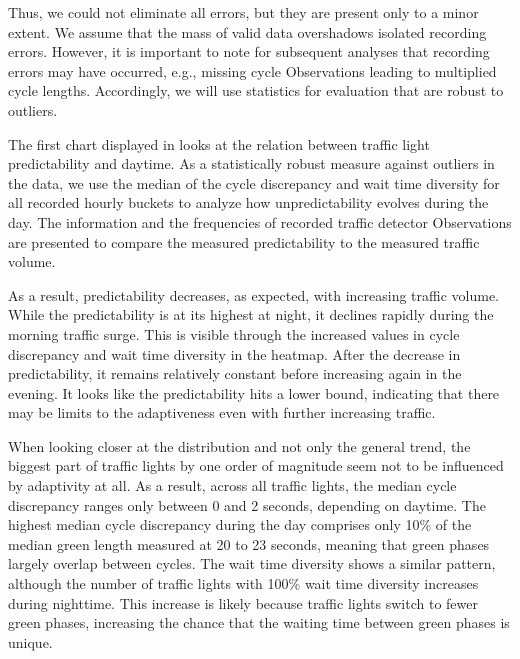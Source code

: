 Thus, we could not eliminate all errors, but they are present only to a minor extent. We assume that the mass of valid data overshadows isolated recording errors. However, it is important to note for subsequent analyses that recording errors may have occurred, e.g., missing cycle Observations leading to multiplied cycle lengths. Accordingly, we will use statistics for evaluation that are robust to outliers.

The first chart displayed in  looks at the relation between traffic light predictability and daytime. As a statistically robust measure against outliers in the data, we use the median of the cycle discrepancy and wait time diversity for all recorded hourly buckets to analyze how unpredictability evolves during the day. The information and the frequencies of recorded traffic detector Observations are presented to compare the measured predictability to the measured traffic volume.

As a result, predictability decreases, as expected, with increasing traffic volume. While the predictability is at its highest at night, it declines rapidly during the morning traffic surge. This is visible through the increased values in cycle discrepancy and wait time diversity in the heatmap. After the decrease in predictability, it remains relatively constant before increasing again in the evening. It looks like the predictability hits a lower bound, indicating that there may be limits to the adaptiveness even with further increasing traffic. 

When looking closer at the distribution and not only the general trend, the biggest part of traffic lights by one order of magnitude seem not to be influenced by adaptivity at all. As a result, across all traffic lights, the median cycle discrepancy ranges only between 0 and 2 seconds, depending on daytime. The highest median cycle discrepancy during the day comprises only 10\% of the median green length measured at 20 to 23 seconds, meaning that green phases largely overlap between cycles. The wait time diversity shows a similar pattern, although the number of traffic lights with 100\% wait time diversity increases during nighttime. This increase is likely because traffic lights switch to fewer green phases, increasing the chance that the waiting time between green phases is unique.

